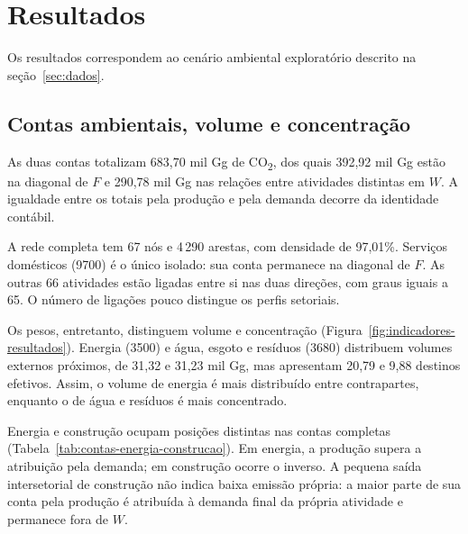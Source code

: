 \section{Resultados}
\label{sec:resultados}

Os resultados correspondem ao cenário ambiental exploratório descrito na seção~\ref{sec:dados}.

\subsection{Contas ambientais, volume e concentração}

As duas contas totalizam 683,70 mil Gg de CO\textsubscript{2}, dos quais 392,92 mil Gg estão na diagonal de $F$ e 290,78 mil Gg nas relações entre atividades distintas em $W$. A igualdade entre os totais pela produção e pela demanda decorre da identidade contábil.

A rede completa tem 67 nós e 4\,290 arestas, com densidade de 97,01\%. Serviços domésticos (9700) é o único isolado: sua conta permanece na diagonal de $F$. As outras 66 atividades estão ligadas entre si nas duas direções, com graus iguais a 65. O número de ligações pouco distingue os perfis setoriais.

Os pesos, entretanto, distinguem volume e concentração (Figura~\ref{fig:indicadores-resultados}). Energia (3500) e água, esgoto e resíduos (3680) distribuem volumes externos próximos, de 31,32 e 31,23 mil Gg, mas apresentam 20,79 e 9,88 destinos efetivos. Assim, o volume de energia é mais distribuído entre contrapartes, enquanto o de água e resíduos é mais concentrado.

Energia e construção ocupam posições distintas nas contas completas (Tabela~\ref{tab:contas-energia-construcao}). Em energia, a produção supera a atribuição pela demanda; em construção ocorre o inverso. A pequena saída intersetorial de construção não indica baixa emissão própria: a maior parte de sua conta pela produção é atribuída à demanda final da própria atividade e permanece fora de $W$.

